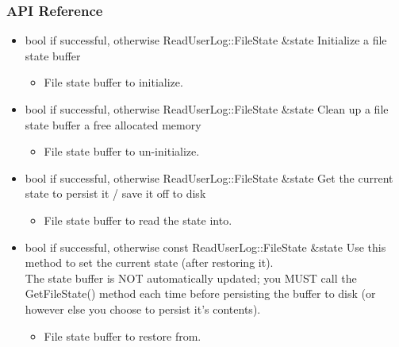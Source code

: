 \subsubsection{API Reference}
\begin{itemize}

\item {}
  {bool} { if successful,  otherwise}
  {ReadUserLog::FileState \&state}
  {Initialize a file state buffer}
  \begin{itemize}
  \item {}
    File state buffer to initialize.
  \end{itemize}

\item {}
  {bool} { if successful,  otherwise}
  {ReadUserLog::FileState \&state}
  {Clean up a file state buffer a free allocated memory}
  \begin{itemize}
  \item {}
    File state buffer to un-initialize.
  \end{itemize}

\item {}
  {bool} { if successful,  otherwise}
  {ReadUserLog::FileState \&state}
  {Get the current state to persist it / save it off to disk}
  \begin{itemize}
  \item {}
    File state buffer to read the state into.
  \end{itemize}

\item {}
  {bool} { if successful,  otherwise}
  {const ReadUserLog::FileState \&state}
  {Use this method to set the current state (after restoring it).
    \\ \Note The state buffer is NOT automatically updated; you MUST
    call the GetFileState() method each time before persisting the
    buffer to disk (or however else you choose to persist it's contents).}
  \begin{itemize}
  \item {}
    File state buffer to restore from.
  \end{itemize}

\end{itemize}

